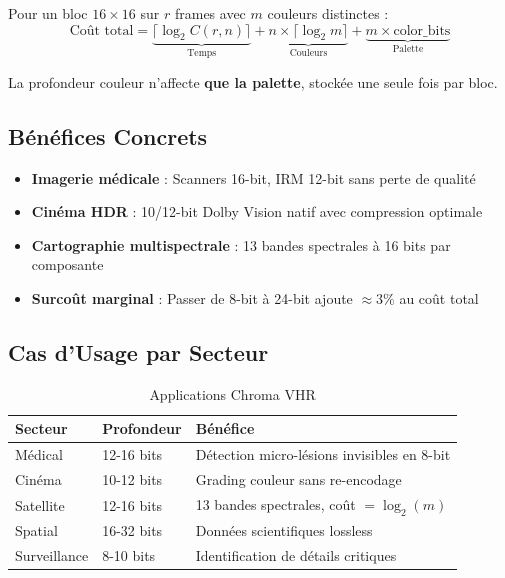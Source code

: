 \documentclass[12pt,a4paper]{article}
\begin{document}
	Pour un bloc $16 \times 16$ sur $r$ frames avec $m$ couleurs distinctes :
	\begin{equation}
		\text{Coût total} = \underbrace{\lceil \log_2 C(r,n) \rceil}_{\text{Temps}} + \underbrace{n \times \lceil \log_2 m \rceil}_{\text{Couleurs}} + \underbrace{m \times \text{color\_bits}}_{\text{Palette}}
	\end{equation}
	
	La profondeur couleur n'affecte \textbf{que la palette}, stockée une seule fois par bloc.
	
	\subsection{Bénéfices Concrets}
	
	\begin{benefitbox}
		\begin{itemize}[leftmargin=*]
			\item \textbf{Imagerie médicale} : Scanners 16-bit, IRM 12-bit sans perte de qualité
			\item \textbf{Cinéma HDR} : 10/12-bit Dolby Vision natif avec compression optimale
			\item \textbf{Cartographie multispectrale} : 13 bandes spectrales à 16 bits par composante
			\item \textbf{Surcoût marginal} : Passer de 8-bit à 24-bit ajoute $\approx 3\%$ au coût total
		\end{itemize}
	\end{benefitbox}
	
	\subsection{Cas d'Usage par Secteur}
	
	\begin{table}[h]
		\centering
		\caption{Applications Chroma VHR}
		\label{tab:chroma_vhr}
		\begin{tabular}{@{}lll@{}}
			\toprule
			\textbf{Secteur} & \textbf{Profondeur} & \textbf{Bénéfice} \\ \midrule
			Médical & 12-16 bits & Détection micro-lésions invisibles en 8-bit \\
			Cinéma & 10-12 bits & Grading couleur sans re-encodage \\
			Satellite & 12-16 bits & 13 bandes spectrales, coût $= \log_2(m)$ \\
			Spatial & 16-32 bits & Données scientifiques lossless \\
			Surveillance & 8-10 bits & Identification de détails critiques \\
			\bottomrule
		\end{tabular}
	\end{table}
	
\end{document}
